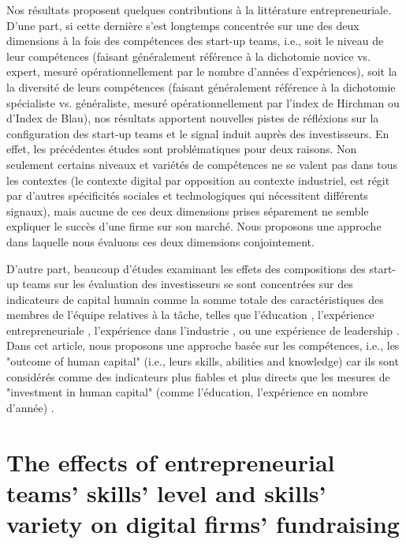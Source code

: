 \documentclass[12pt]{article}
\begin{document}
Nos résultats proposent quelques contributions à la littérature entrepreneuriale. D'une part, si cette dernière s'est longtemps concentrée sur une des deux dimensions à la fois des compétences des start-up teams, i.e., soit le niveau de leur compétences (faisant généralement référence à la dichotomie novice vs. expert, mesuré opérationnellement par le nombre d'années d'expériences), soit la la diversité de leurs compétences (faisant généralement référence à la dichotomie spécialiste vs. généraliste, mesuré opérationnellement par l'index de Hirchman ou d'Index de Blau), nos résultats apportent nouvelles pistes de réfléxions sur la configuration des start-up teams et le signal induit auprès des investisseurs. En effet, les précédentes études sont problématiques pour deux raisons. Non seulement certains niveaux et variétés de compétences ne se valent pas dans tous les contextes (le contexte digital par opposition au contexte industriel, est régit par d'autres spécificités sociales et technologiques qui nécessitent différents signaux), mais aucune de ces deux dimensions prises séparement ne semble expliquer le succès d'une firme sur son marché. Nous proposons une approche dans laquelle nous évaluons ces deux dimensions conjointement.

D'autre part, beaucoup d'études examinant les effets des compositions des start-up teams sur les évaluation des investisseurs se sont concentrées sur des indicateurs de capital humain comme la somme totale des caractéristiques des membres de l'équipe relatives à la tâche, telles que l'éducation \citep{franke2008venture}, l'expérience entrepreneuriale \citep{beckman2007early}, l'expérience dans l'industrie \citep{becker2015new}, ou une expérience de leadership \citep{hoenig2015quality}. Dans cet article, nous proposons une approche basée sur les compétences, i.e., les "outcome of human capital" (i.e., leurs skills, abilities and knowledge) car ils sont considérés comme des indicateurs plus fiables et plus directs que les mesures de "investment in human capital" (comme l'éducation, l'expérience en nombre d'année) \citep{unger2011human, marvel2016human}.

\section{The effects of entrepreneurial teams' skills' level and skills' variety on digital firms' fundraising}
\end{document}
